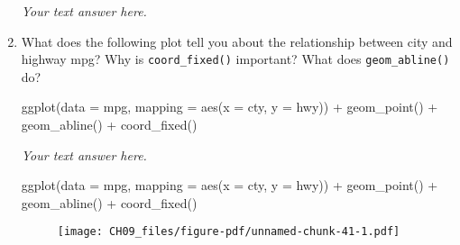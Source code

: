 \documentclass[
  letterpaper,
  DIV=11,
  numbers=noendperiod]{scrreprt}
\newenvironment{Shaded}{\begin{snugshade}}{\end{snugshade}}
\newcommand{\AttributeTok}[1]{\textcolor[rgb]{0.40,0.45,0.13}{#1}}
\newcommand{\FunctionTok}[1]{\textcolor[rgb]{0.28,0.35,0.67}{#1}}
\newcommand{\NormalTok}[1]{\textcolor[rgb]{0.00,0.23,0.31}{#1}}
\newcommand{\SpecialCharTok}[1]{\textcolor[rgb]{0.37,0.37,0.37}{#1}}
\begin{document}
\begin{enumerate}
\begin{tcolorbox}
  \emph{Your text answer here.}

  \end{tcolorbox}
\item
  What does the following plot tell you about the relationship between
  city and highway mpg? Why is \texttt{coord\_fixed()} important? What
  does \texttt{geom\_abline()} do?

\begin{Shaded}
\begin{Highlighting}[]
\FunctionTok{ggplot}\NormalTok{(}\AttributeTok{data =}\NormalTok{ mpg, }\AttributeTok{mapping =} \FunctionTok{aes}\NormalTok{(}\AttributeTok{x =}\NormalTok{ cty, }\AttributeTok{y =}\NormalTok{ hwy)) }\SpecialCharTok{+}
  \FunctionTok{geom\_point}\NormalTok{() }\SpecialCharTok{+} 
  \FunctionTok{geom\_abline}\NormalTok{() }\SpecialCharTok{+}
  \FunctionTok{coord\_fixed}\NormalTok{()}
\end{Highlighting}
\end{Shaded}

  \begin{tcolorbox}[enhanced jigsaw, breakable, bottomtitle=1mm, left=2mm, colback=white, toprule=.15mm, leftrule=.75mm, colframe=quarto-callout-note-color-frame, colbacktitle=quarto-callout-note-color!10!white, title={Answer}, coltitle=black, toptitle=1mm, bottomrule=.15mm, opacitybacktitle=0.6, arc=.35mm, rightrule=.15mm, titlerule=0mm, opacityback=0]

  \emph{Your text answer here.}

\begin{Shaded}
\begin{Highlighting}[]
\FunctionTok{ggplot}\NormalTok{(}\AttributeTok{data =}\NormalTok{ mpg, }\AttributeTok{mapping =} \FunctionTok{aes}\NormalTok{(}\AttributeTok{x =}\NormalTok{ cty, }\AttributeTok{y =}\NormalTok{ hwy)) }\SpecialCharTok{+}
  \FunctionTok{geom\_point}\NormalTok{() }\SpecialCharTok{+} 
  \FunctionTok{geom\_abline}\NormalTok{() }\SpecialCharTok{+}
  \FunctionTok{coord\_fixed}\NormalTok{()}
\end{Highlighting}
\end{Shaded}

  \begin{figure}[H]

  {\centering \texttt{[image: CH09\_files/figure-pdf/unnamed-chunk-41-1.pdf]}

  }

  \end{figure}

  \end{tcolorbox}
\end{enumerate}
\end{document}

